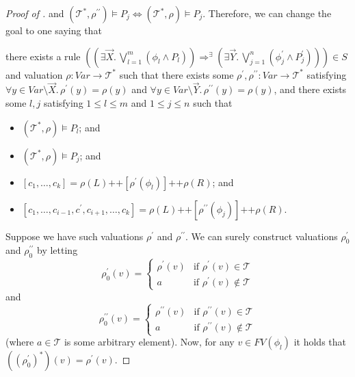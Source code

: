 \documentclass{article}
\newenvironment{proofenv}
  {
    \VerbatimEnvironment\begin{tcolorbox}[colback=black!0!white] %
  }
  {
   \end{tcolorbox}
  }
\begin{document}
\begin{proof}[Proof of ]
and $(\mathcal{T}^*, \rho^{\prime\prime}) \vDash P_j \iff (\mathcal{T}^*, \rho) \vDash P_j$.
Therefore, we can change the goal to one saying that
\begin{proofenv}
there exists a rule $((\exists \vec{X}.\, \bigvee_{l=1}^{m} (\phi_l \land P_l)) \Rightarrow^\exists (\exists \vec{Y}.\, \bigvee_{j=1}^{n} (\phi^\prime_j \land P^\prime_j))) \in S$
and valuation $\rho : \mathit{Var} \to \mathcal{T}^*$ such that
there exists some $\rho^\prime,\rho^{\prime\prime} : \mathit{Var} \to \mathcal{T}^*$
satisfying $\forall y \in \mathit{Var} \setminus \vec{X}.\, \rho^\prime(y) = \rho(y)$
and $\forall y \in \mathit{Var} \setminus \vec{Y}.\, \rho^{\prime\prime}(y) = \rho(y)$,
and there exists some $l,j$ satisfying $1 \leq l \leq m$ and $1 \leq j \leq n$ such that
\begin{itemize}
    \item $(\mathcal{T}^*, \rho) \vDash P_l$; and
    \item $(\mathcal{T}^*, \rho) \vDash P_j$; and
    \item $[c_1,\ldots,c_k] = \rho(L) \texttt{++} [\rho^\prime(\phi_l)] \texttt{++} \rho(R)$; and
    \item $[c_1, \ldots, c_{i-1}, c^\prime, c_{i+1}, \ldots, c_k] = \rho(L) \texttt{++} [\rho^{\prime\prime}(\phi_j)] 
    \texttt{++} \rho(R)$.
\end{itemize}
\end{proofenv}
Suppose we have such valuations $\rho^\prime$ and $\rho^{\prime\prime}$.
We can surely construct valuations $\rho_0^\prime$ and $\rho_0^{\prime\prime}$ by letting
\begin{equation*}
\rho_0^\prime(v)=
    \begin{cases}
        \rho^\prime(v) & \text{if } \rho^\prime(v) \in \mathcal{T}\\
        a & \text{if } \rho^\prime(v) \not\in \mathcal{T}
    \end{cases}
\end{equation*}
and
\begin{equation*}
\rho_0^{\prime\prime}(v)=
    \begin{cases}
        \rho^{\prime\prime}(v) & \text{if } \rho^{\prime\prime}(v) \in \mathcal{T}\\
        a & \text{if } \rho^{\prime\prime}(v) \not\in \mathcal{T}
    \end{cases}
\end{equation*}
(where $a \in \mathcal{T}$ is some arbitrary element).
Now, for any $v \in \mathit{FV}(\phi_l)$ it holds that
$((\rho_0^\prime)^*)(v) = \rho^\prime(v)$.

\end{proof}
\end{document}
